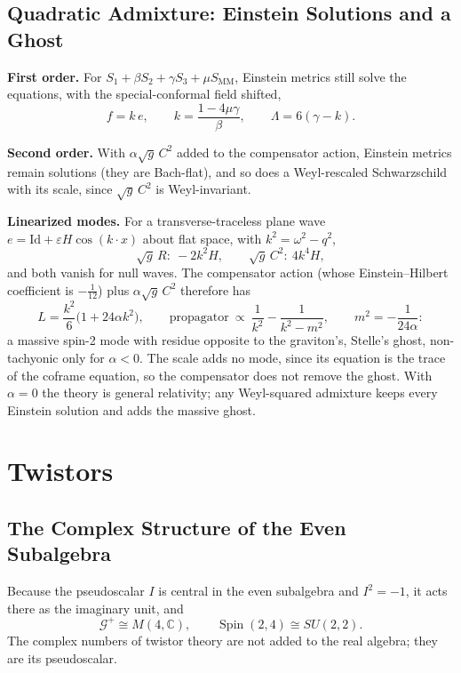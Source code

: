 \documentclass[11pt,a4paper]{article}
\newcommand{\C}{\mathbb{C}}
\newcommand{\Spin}{\operatorname{Spin}}
\newcommand{\G}{\mathcal{G}}
\begin{document}
\subsection{Quadratic Admixture: Einstein Solutions and a Ghost}

\textbf{First order.} For \(S_1+\beta S_2+\gamma S_3+\mu S_{\mathrm{MM}}\),
Einstein metrics still solve the equations, with the
special-conformal field shifted,
\[
    f=k\,e,\qquad
    k=\frac{1-4\mu\gamma}{\beta},\qquad
    \Lambda=6(\gamma-k).
\]

\textbf{Second order.} With \(\alpha\sqrt g\,C^2\) added to the
compensator action, Einstein metrics remain solutions (they are
Bach-flat), and so does a Weyl-rescaled Schwarzschild with its scale,
since \(\sqrt g\,C^2\) is Weyl-invariant.

\textbf{Linearized modes.} For a transverse-traceless plane wave
\(e=\mathrm{Id}+\varepsilon H\cos(k\cdot x)\) about flat space, with
\(k^2=\omega^2-q^2\),
\[
    \sqrt g\,R:\ -2k^2H,
    \qquad
    \sqrt g\,C^2:\ 4k^4H,
\]
and both vanish for null waves. The compensator action (whose
Einstein--Hilbert coefficient is \(-\tfrac1{12}\)) plus
\(\alpha\sqrt g\,C^2\) therefore has
\[
    \boxed{
        L=\frac{k^2}{6}\bigl(1+24\alpha k^2\bigr),
        \qquad
        \text{propagator}\ \propto\
        \frac1{k^2}-\frac1{k^2-m^2},
        \qquad
        m^2=-\frac1{24\alpha}:
    }
\]
a massive spin-2 mode with residue opposite to the graviton's,
Stelle's ghost, non-tachyonic only for \(\alpha<0\). The scale adds no
mode, since its equation is the trace of the coframe equation, so the
compensator does not remove the ghost. With \(\alpha=0\) the theory is
general relativity; any Weyl-squared admixture keeps every Einstein
solution and adds the massive ghost.

\section{Twistors}
\label{sec:twistors}

\subsection{The Complex Structure of the Even Subalgebra}

Because the pseudoscalar \(I\) is central in the even subalgebra and
\(I^2=-1\), it acts there as the imaginary unit, and
\[
    \boxed{
        \G^{+}\cong M(4,\C),
        \qquad
        \Spin(2,4)\cong SU(2,2).
    }
\]
The complex numbers of twistor theory are not added to the real
algebra; they are its pseudoscalar.
\end{document}
